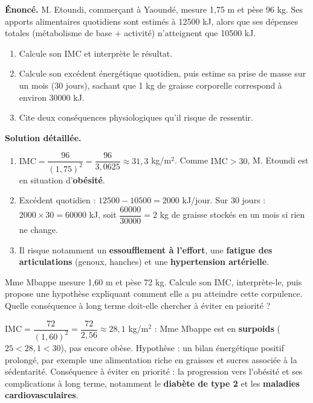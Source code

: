 \documentclass[11pt]{article}
\begin{document}
\begin{exoresolu}
\textbf{Énoncé.} M. Etoundi, commerçant à Yaoundé, mesure 1,75 m et pèse 96 kg. Ses apports alimentaires quotidiens sont estimés à \num{12500} kJ, alors que ses dépenses totales (métabolisme de base + activité) n'atteignent que \num{10500} kJ.
\begin{enumerate}
  \item Calcule son IMC et interprète le résultat.
  \item Calcule son excédent énergétique quotidien, puis estime sa prise de masse sur un mois (30 jours), sachant que 1 kg de graisse corporelle correspond à environ \num{30000} kJ.
  \item Cite deux conséquences physiologiques qu'il risque de ressentir.
\end{enumerate}
\tcblower
\textbf{Solution détaillée.}
\begin{enumerate}
  \item $\mathrm{IMC} = \dfrac{96}{(1,75)^2} = \dfrac{96}{3,0625} \approx 31,3$ kg/m$^2$. Comme $\mathrm{IMC} > 30$, M. Etoundi est en situation d'\textbf{obésité}.
  \item Excédent quotidien : $\num{12500} - \num{10500} = \num{2000}$ kJ/jour. Sur 30 jours : $\num{2000} \times 30 = \num{60000}$ kJ, soit $\dfrac{\num{60000}}{\num{30000}} = 2$ kg de graisse stockés en un mois si rien ne change.
  \item Il risque notamment un \textbf{essoufflement à l'effort}, une \textbf{fatigue des articulations} (genoux, hanches) et une \textbf{hypertension artérielle}.
\end{enumerate}
\end{exoresolu}

\begin{exercice}
Mme Mbappe mesure 1,60 m et pèse 72 kg. Calcule son IMC, interprète-le, puis propose une hypothèse expliquant comment elle a pu atteindre cette corpulence. Quelle conséquence à long terme doit-elle chercher à éviter en priorité ?
\end{exercice}

\begin{corrige}[Exercice 1]
$\mathrm{IMC} = \dfrac{72}{(1,60)^2} = \dfrac{72}{2,56} \approx 28,1$ kg/m$^2$ : Mme Mbappe est en \textbf{surpoids} ($25 < 28,1 < 30$), pas encore obèse. Hypothèse : un bilan énergétique positif prolongé, par exemple une alimentation riche en graisses et sucres associée à la sédentarité. Conséquence à éviter en priorité : la progression vers l'obésité et ses complications à long terme, notamment le \textbf{diabète de type 2} et les \textbf{maladies cardiovasculaires}.
\end{corrige}
\end{document}
